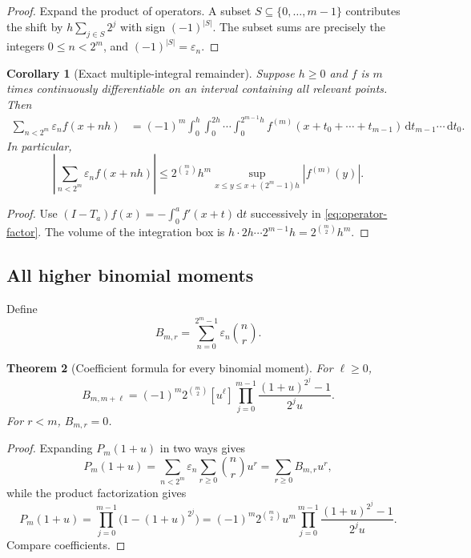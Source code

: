 \documentclass[11pt,oneside]{article}
\newtheorem{theorem}{Theorem}[section]
\newtheorem{corollary}[theorem]{Corollary}
\theoremstyle{definition}
\theoremstyle{remark}
\newcommand{\dd}{\,\mathrm d}
\newcommand{\eps}{\varepsilon}
\newcommand{\1}{\mathbf 1}
\begin{document}
\begin{proof}
Expand the product of operators.  A subset \(S\subseteq\{0,\ldots,m-1\}\) contributes the
shift by \(h\sum_{j\in S}2^j\) with sign \((-1)^{|S|}\).  The subset sums are precisely the
integers \(0\le n<2^m\), and \((-1)^{|S|}=\eps_n\).
\end{proof}

\begin{corollary}[Exact multiple-integral remainder]
\label{cor:integral-remainder}
Suppose \(h\ge0\) and \(f\) is \(m\) times continuously differentiable on an interval
containing all relevant points.  Then
\begin{align}
 \sum_{n<2^m}\eps_nf(x+nh)
 &=(-1)^m
 \int_0^h\int_0^{2h}\cdots\int_0^{2^{m-1}h}
 f^{(m)}(x+t_0+\cdots+t_{m-1})
 \dd t_{m-1}\cdots\dd t_0.                                \label{eq:integral-remainder}
\end{align}
In particular,
\begin{equation}
 \left|\sum_{n<2^m}\eps_nf(x+nh)\right|
 \le 2^{\binom m2}h^m
 \sup_{x\le y\le x+(2^m-1)h}|f^{(m)}(y)|.
 \label{eq:difference-bound}
\end{equation}
\end{corollary}

\begin{proof}
Use \((I-T_a)f(x)=-\int_0^af'(x+t)\dd t\) successively in
\eqref{eq:operator-factor}.  The volume of the integration box is
\(h\cdot2h\cdots2^{m-1}h=2^{\binom m2}h^m\).
\end{proof}

\subsection{All higher binomial moments}

Define
\begin{equation}
 B_{m,r}=\sum_{n=0}^{2^m-1}\eps_n\binom nr.
 \label{eq:Bmr}
\end{equation}

\begin{theorem}[Coefficient formula for every binomial moment]
\label{thm:all-binomial-moments}
For \(\ell\ge0\),
\begin{equation}
 \boxed{
 B_{m,m+\ell}
 =(-1)^m2^{\binom m2}[u^\ell]
 \prod_{j=0}^{m-1}
 \frac{(1+u)^{2^j}-1}{2^ju}.}
 \label{eq:all-binomial-moments}
\end{equation}
For \(r<m\), \(B_{m,r}=0\).
\end{theorem}

\begin{proof}
Expanding \(P_m(1+u)\) in two ways gives
\[
 P_m(1+u)
 =\sum_{n<2^m}\eps_n\sum_{r\ge0}\binom nru^r
 =\sum_{r\ge0}B_{m,r}u^r,
\]
while the product factorization gives
\[
 P_m(1+u)
 =\prod_{j=0}^{m-1}\bigl(1-(1+u)^{2^j}\bigr)
 =(-1)^m2^{\binom m2}u^m
  \prod_{j=0}^{m-1}\frac{(1+u)^{2^j}-1}{2^ju}.
\]
Compare coefficients.
\end{proof}
\end{document}
